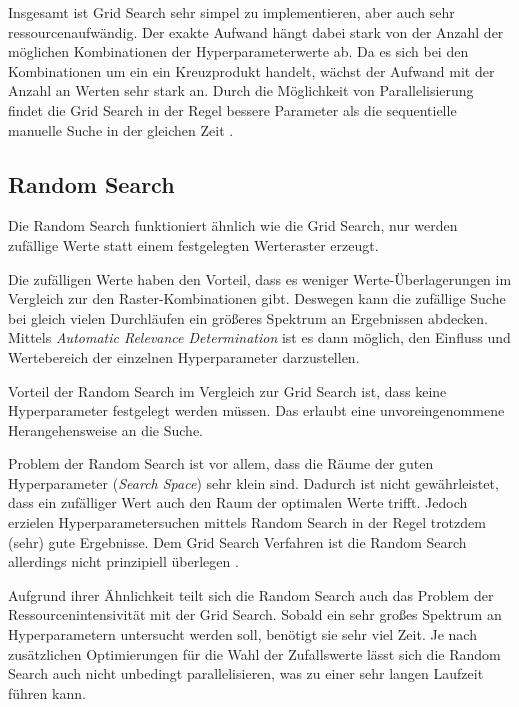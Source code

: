 Insgesamt ist Grid Search sehr simpel zu implementieren, aber auch sehr ressourcenaufwändig.
Der exakte Aufwand hängt dabei stark von der Anzahl der möglichen Kombinationen der Hyperparameterwerte ab.
Da es sich bei den Kombinationen um ein ein Kreuzprodukt handelt, wächst der Aufwand mit der Anzahl an Werten sehr stark an.
Durch die Möglichkeit von Parallelisierung findet die Grid Search in der Regel bessere Parameter als die sequentielle manuelle Suche in der gleichen Zeit \cite{hyperparameters-random-search}.

\subsection{Random Search}
Die Random Search \cite{hyperparameters-random-search} funktioniert ähnlich wie die Grid Search, nur werden zufällige Werte statt einem festgelegten Werteraster erzeugt.
\newline

Die zufälligen Werte haben den Vorteil, dass es weniger Werte-Überlagerungen im Vergleich zur den Raster-Kombinationen gibt.
Deswegen kann die zufällige Suche bei gleich vielen Durchläufen ein größeres Spektrum an Ergebnissen abdecken.
Mittels \textit{Automatic Relevance Determination} \cite{automatic-relevance-determination} ist es dann möglich, den Einfluss und Wertebereich der einzelnen Hyperparameter darzustellen.
\newline

Vorteil der Random Search im Vergleich zur Grid Search ist, dass keine Hyperparameter festgelegt werden müssen.
Das erlaubt eine unvoreingenommene Herangehensweise an die Suche.

Problem der Random Search ist vor allem, dass die Räume der guten Hyperparameter (\textit{Search Space}) sehr klein sind.
Dadurch ist nicht gewährleistet, dass ein zufälliger Wert auch den Raum der optimalen Werte trifft.
Jedoch erzielen Hyperparametersuchen mittels Random Search in der Regel trotzdem (sehr) gute Ergebnisse.
Dem Grid Search Verfahren ist die Random Search allerdings nicht prinzipiell überlegen \cite{hyperparameters-random-search}.

Aufgrund ihrer Ähnlichkeit teilt sich die Random Search auch das Problem der Ressourcenintensivität mit der Grid Search.
Sobald ein sehr großes Spektrum an Hyperparametern untersucht werden soll, benötigt sie sehr viel Zeit.
Je nach zusätzlichen Optimierungen für die Wahl der Zufallswerte lässt sich die Random Search auch nicht unbedingt parallelisieren, was zu einer sehr langen Laufzeit führen kann.


